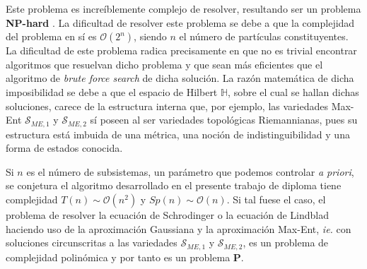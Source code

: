 \documentclass{report} %
\numberwithin{equation}{section}
\begin{document}
Este problema es increíblemente complejo de resolver, resultando ser un problema \textbf{NP-hard} \cite{bolotin2013computational, bolotin2014computational}. La dificultad de resolver este problema se debe a que la complejidad del problema en sí es $\mathcal{O}(2^n)$, siendo $n$ el número de partículas constituyentes. La dificultad de este problema radica precisamente en que no es trivial encontrar algoritmos que resuelvan dicho problema y que sean más eficientes que el algoritmo de \textit{brute force search} \cite{Nielsen.00} de dicha solución. La razón matemática de dicha imposibilidad se debe a que el espacio de Hilbert $\mathds{H}$, sobre el cual se hallan dichas soluciones, carece de la estructura interna que, por ejemplo, las variedades Max-Ent $\mathcal{S}_{ME,1}$ y $\mathcal{S}_{ME,2}$ sí poseen al ser variedades topológicas Riemannianas, pues su estructura está imbuida de una métrica, una noción de indistinguibilidad y una forma de estados conocida. 


Si $n$ es el número de subsistemas, un parámetro que podemos controlar \textit{a priori}, se conjetura el algoritmo desarrollado en el presente trabajo de diploma tiene complejidad $T(n) \sim \mathcal{O}(n^2)$ y $Sp(n) \sim \mathcal{O}(n)$. Si tal fuese el caso, el problema de resolver la ecuación de Schrodinger o la ecuación de Lindblad haciendo uso de la aproximación Gaussiana y la aproximación Max-Ent, \textit{ie.} con soluciones circunscritas a las variedades $\mathcal{S}_{ME,1}$ y $\mathcal{S}_{ME,2}$, es un problema de complejidad polinómica y por tanto es un problema $\mathbf{P}$. 











\end{document}
